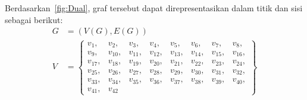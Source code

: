 Berdasarkan~\ref{fig:Dual}, graf tersebut dapat direpresentasikan dalam titik dan sisi sebagai berikut:
\begin{align*}
	G &= (V(G), E(G))\\
	V &= \left\lbrace 
	\begin{array}{llllllll}
		v_1, & v_2, & v_3, & v_4, & v_5, & v_6, & v_7, & v_8,\\
		v_9, & v_{10}, & v_{11}, & v_{12}, & v_{13}, & v_{14}, & v_{15}, & v_{16},\\
		v_{17}, & v_{18}, & v_{19}, & v_{20}, & v_{21}, & v_{22}, & v_{23}, & v_{24},\\
		v_{25}, & v_{26}, & v_{27}, & v_{28}, & v_{29}, & v_{30}, & v_{31}, & v_{32},\\
		v_{33}, & v_{34}, & v_{35}, & v_{36}, & v_{37}, & v_{38}, & v_{39}, & v_{40},\\
		v_{41}, & v_{42}
	\end{array}
	\right\rbrace
\end{align*}

